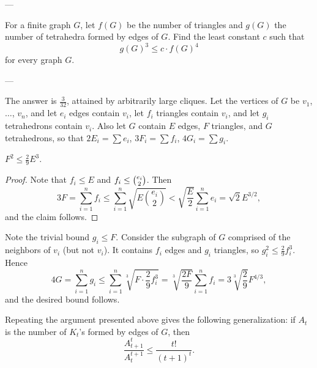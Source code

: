 
---

For a finite graph $G$, let $f(G)$ be the number of triangles and $g(G)$ the number of tetrahedra formed by edges of $G$. Find the least constant $c$ such that\[g(G)^3\le c\cdot f(G)^4\]
for every graph $G$.

---

The answer is $\tfrac3{32}$, attained by arbitrarily large cliques. Let the vertices of $G$ be $v_1$, $\ldots$, $v_n$, and let $e_i$ edges contain $v_i$, let $f_i$ triangles contain $v_i$, and let $g_i$ tetrahedrons contain $v_i$. Also let $G$ contain $E$ edges, $F$ triangles, and $G$ tetrahedrons, so that $2E_i=\sum e_i$, $3F_i=\sum f_i$, $4G_i=\sum g_i$.
\begin{claim*}
    $F^2\le\tfrac29E^3$.
\end{claim*}
\begin{proof}
    Note that $f_i\le E$ and $f_i\le\tbinom{e_i}2$. Then \[3F=\sum_{i=1}^nf_i\le\sum_{i=1}^n\sqrt{E\binom{e_i}2}<\sqrt{\frac E2}\sum_{i=1}^ne_i=\sqrt2E^{3/2},\]
    and the claim follows.
\end{proof}

Note the trivial bound $g_i\le F$. Consider the subgraph of $G$ comprised of the neighbors of $v_i$ (but not $v_i$). It contains $f_i$ edges and $g_i$ triangles, so $g_i^2\le\tfrac29f_i^3$. Hence \[4G=\sum_{i=1}^ng_i\le\sum_{i=1}^n\sqrt[3]{F\cdot\frac29f_i^3}=\sqrt[3]{\frac{2F}9}\sum_{i=1}^nf_i=3\sqrt[3]{\frac29}F^{4/3},\]
and the desired bound follows.
\begin{remark}
    Repeating the argument presented above gives the following generalization: if $A_t$ is the number of $K_t$'s formed by edges of $G$, then \[\frac{A_{t+1}^t}{A_t^{t+1}}\le\frac{t!}{(t+1)^t}.\]
\end{remark}

